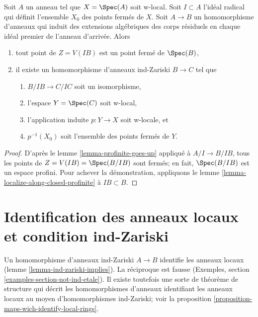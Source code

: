 \begin{lemma}
\label{lemma-w-local-algebraic-residue-field-extensions}
Soit $A$ un anneau tel que $X = \Spec(A)$ soit w-local. Soit $I \subset A$
l'id\'eal radical qui d\'efinit l'ensemble $X_0$ des points ferm\'es de $X$.
Soit $A \to B$ un homomorphisme d'anneaux qui induit des extensions alg\'ebriques
des corps r\'esiduels en chaque id\'eal premier de l'anneau d'arriv\'ee. Alors
\begin{enumerate}
\item tout point de $Z = V(IB)$ est un point ferm\'e de $\Spec(B)$,
\item il existe un homomorphisme d'anneaux ind-Zariski $B \to C$ tel que
\begin{enumerate}
\item $B/IB \to C/IC$ soit un isomorphisme,
\item l'espace $Y = \Spec(C)$ soit w-local,
\item l'application induite $p : Y \to X$ soit w-locale, et
\item $p^{-1}(X_0)$ soit l'ensemble des points ferm\'es de $Y$.
\end{enumerate}
\end{enumerate}
\end{lemma}

\begin{proof}
D'apr\`es le lemme \ref{lemma-profinite-goes-up} appliqu\'e \`a $A/I \to B/IB$,
tous les points de $Z = V(IB) = \Spec(B/IB)$ sont ferm\'es; en fait, $\Spec(B/IB)$
est un espace profini.
Pour achever la d\'emonstration, appliquons le lemme \ref{lemma-localize-along-closed-profinite}
\`a $IB \subset B$.
\end{proof}





\section{Identification des anneaux locaux et condition ind-Zariski}
\label{section-connected-components}

\noindent
Un homomorphisme d'anneaux ind-Zariski $A \to B$ identifie les anneaux locaux
(lemme \ref{lemma-ind-zariski-implies}). La r\'eciproque est fausse
(Exemples, section \ref{examples-section-not-ind-etale}).
Il existe toutefois une sorte de th\'eor\`eme de structure qui d\'ecrit les
homomorphismes d'anneaux identifiant les anneaux locaux au moyen d'homomorphismes
ind-Zariski; voir la proposition \ref{proposition-maps-wich-identify-local-rings}.


